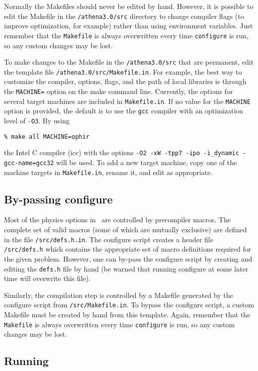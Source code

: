 Normally the Makefiles should never be edited by hand.  However,
it is possible to edit the Makefile in the {\tt /athena3.0/src} directory to
change compiler flags (to improve optimization, for example)
rather than using
environment variables.  Just remember that the {\tt Makefile} is always 
overwritten every time {\tt configure} is run, so any custom changes may be
lost.

To make changes to the Makefile in the {\tt /athena3.0/src} that are permanent,
edit the template file {\tt /athena3.0/src/Makefile.in}.
For example, the best way to customize the compiler, options, flags,
and the path of local libraries is through the {\tt MACHINE=} option
on the make command line.  Currently, the options for several target machines are
included in {\tt Makefile.in}.  If no value for the {\tt MACHINE} option is
provided, the default is to use the {\tt gcc} compiler
with an optimization level of {\tt -O3}.  By using
\begin{verbatim}
% make all MACHINE=ophir
\end{verbatim}
the Intel C compiler (icc) with the options
{\tt -O2 -xW -tpp7 -ipo -i\_dynamic -gcc-name=gcc32} will be used.  To add
a new target machine, copy one of the machine targets in {\tt Makefile.in},
rename it, and edit as appropriate. 

\subsection{By-passing configure}

Most of the physics options in \ath\ are controlled by precompiler macros.  The
complete set of valid macros (some of which are mutually exclusive) are
defined in the file {\tt /src/defs.h.in}.  
The configure script creates a header file {\tt /src/defs.h} which contains
the appropriate set of macro definitions required for the given problem.
However, one can by-pass the configure script by creating and editing the
{\tt defs.h} file by hand (be warned that running configure at some later time
will overwrite this file).

Similarly, the compilation step is controlled by a Makefile generated by
the configure script from {\tt /src/Makefile.in}.  To bypass the configure
script, a custom Makefile must be created by hand from this template.
Again, remember that the {\tt Makefile} is always
overwritten every time {\tt configure} is run, so any custom changes may be
lost.

\subsection{Running \ath}

